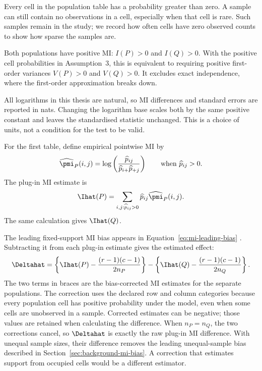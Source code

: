 \begin{assumption}
Every cell in the population table has a probability greater than zero. A
sample can still contain no observations in a cell, especially when that cell
is rare. Such samples remain in the study; we record how often cells have
zero observed counts to show how sparse the samples are.
\end{assumption}

\begin{assumption}[Positive MI]
Both populations have positive MI: \(I(P)>0\) and \(I(Q)>0\). With the positive
cell probabilities in Assumption~3, this is equivalent to requiring positive
first-order variances \(V(P)>0\) and \(V(Q)>0\). It excludes exact
independence, where the first-order approximation breaks down.
\end{assumption}

\begin{assumption}
All logarithms in this thesis are natural, so MI differences and standard
errors are reported in nats. Changing the logarithm base scales both by the
same positive constant and leaves the standardised statistic unchanged.
This is a choice of units, not a condition for the test to be valid.
\end{assumption}

\medskip
{}

For the first table, define empirical pointwise MI by
\begin{equation}
  \widehat\pmi_P(i,j)
  =\log\left(
  \frac{\widehat p_{ij}}
       {\widehat p_{i+}\widehat p_{+j}}
  \right)
  \qquad\text{when }\widehat p_{ij}>0.
  \label{eq:empirical-pmi}
\end{equation}
The plug-in MI estimate is
\begin{equation}
  \Ihat(P)
  =\sum_{i,j:\widehat p_{ij}>0}
  \widehat p_{ij}\widehat\pmi_P(i,j).
  \label{eq:plugin-mi}
\end{equation}
The same calculation gives \(\Ihat(Q)\).

The leading fixed-support MI bias appears in
Equation~\eqref{eq:mi-leading-bias} \citep{miller1955,moddemeijer1989}. Subtracting it
from each plug-in estimate gives the estimated effect:
\begin{equation}
  \Deltahat
  =\left\{\Ihat(P)-\frac{(r-1)(c-1)}{2n_P}\right\}
  -\left\{\Ihat(Q)-\frac{(r-1)(c-1)}{2n_Q}\right\}.
  \label{eq:bias-corrected-difference}
\end{equation}
The two terms in braces are the bias-corrected MI estimates for the separate
populations.
The correction uses the declared row and column categories because every
population cell has positive probability under the model, even when some
cells are unobserved in a sample. Corrected estimates can be negative;
those values are retained when calculating the difference.
When \(n_P=n_Q\), the two corrections cancel, so \(\Deltahat\) is exactly
the raw plug-in MI difference. With unequal sample sizes, their difference
removes the leading unequal-sample bias described in
Section~\ref{sec:background-mi-bias}. A correction that estimates support
from occupied cells would be a different estimator.


